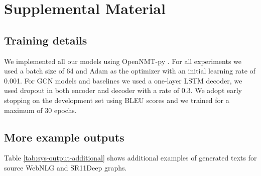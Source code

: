 \documentclass[11pt,a4paper,dvipsnames]{article}
\begin{document}
\section{Supplemental Material}
\label{sec:supMaterial}

\subsection{Training details}
We implemented all our models using OpenNMT-py \cite{opennmt}.
For all experiments we used a batch size of 64 and Adam \cite{kingma2015adam} as the optimizer with an initial learning rate of 0.001.
For GCN models and baselines we used a one-layer LSTM decoder, we used dropout \cite{SrivastavaHKSS14} in  both encoder and decoder with a rate of 0.3. 
We adopt early stopping on the development set using BLEU scores and we trained for a maximum of 30 epochs.
\subsection{More example outputs}
Table \ref{tab:sys-output-additional} shows additional examples
of generated texts for source WebNLG and SR11Deep graphs.
\end{document}
